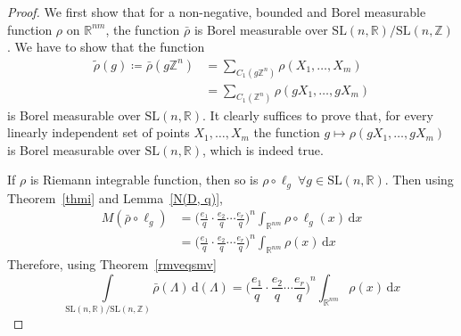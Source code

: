 \documentclass[11pt]{article}
\theoremstyle{definition}
\theoremstyle{proof}
\begin{document}
\begin{proof}
    We first show that for a non-negative, bounded and Borel measurable function $\rho$ on $\mathbb{R}^{nm}$, the function $\bar{\rho }$ is Borel measurable over $\mathrm{SL}(n,\mathbb{R})/\mathrm{SL}(n,\mathbb{Z})$.
    We have to show that the function
    \begin{align*}
        \widetilde{\rho }(g) \coloneqq \bar{\rho }(g \mathbb{Z}^{n}) &= \sum\limits_{C_1(g \mathbb{Z}^{n})} \rho (X_1, \ldots, X_m) \\
        &= \sum\limits_{C_1(\mathbb{Z}^{n})} \rho (g X_1, \ldots, g X_m)
    \end{align*}
    is Borel measurable over $\mathrm{SL}(n,\mathbb{R})$.
    It clearly suffices to prove that, for every linearly independent set of points $X_1, \ldots, X_m$ the function $g \mapsto \rho (g X_1, \ldots, g X_m)$ is Borel measurable over $\mathrm{SL}(n,\mathbb{R})$, which is indeed true.

    If $\rho$ is Riemann integrable function, then so is $\rho \circ \ell_g \ \forall g \in \mathrm{SL}(n,\mathbb{R})$.
    Then using Theorem~\ref{thmi} and Lemma~\ref{N(D, q)},
    \begin{align*}
        M(\bar{\rho }\circ \ell_g) &= {\bigg(\frac{e_1}{q} \cdot \frac{e_2}{q} \cdots \frac{e_r}{q} \bigg)}^n \int_{\mathbb{R}^{nm}} \rho \circ \ell_g (x) \, \mathrm{d} x \\
        &= {\bigg(\frac{e_1}{q} \cdot \frac{e_2}{q} \cdots \frac{e_r}{q} \bigg)}^n \int_{\mathbb{R}^{nm}} \rho (x) \, \mathrm{d} x 
    \end{align*}
    Therefore, using Theorem~\ref{rmveqsmv}
    \[
        \int\limits_{\mathrm{SL}(n,\mathbb{R})/\mathrm{SL}(n,\mathbb{Z})} \bar{\rho } (\Lambda ) \, \mathrm{d} (\Lambda ) = {\bigg(\frac{e_1}{q} \cdot \frac{e_2}{q} \cdots \frac{e_r}{q} \bigg)}^n \int_{\mathbb{R}^{nm}} \rho (x) \, \mathrm{d} x
    \]


\end{proof}
\end{document}
